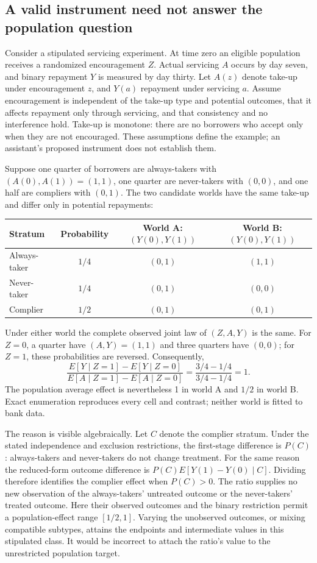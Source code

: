 \subsection{A valid instrument need not answer the population question}

Consider a stipulated servicing experiment. At time zero an eligible population
receives a randomized encouragement $Z$. Actual servicing $A$ occurs by day
seven, and binary repayment $Y$ is measured by day thirty. Let $A(z)$ denote
take-up under encouragement $z$, and $Y(a)$ repayment under servicing $a$.
Assume encouragement is independent of the take-up type and potential outcomes,
that it affects repayment only through servicing, and that consistency and no
interference hold. Take-up is monotone: there are no borrowers who accept only
when they are not encouraged. These assumptions define the example; an
assistant's proposed instrument does not establish them. \citep{exec14_ident_exact}

Suppose one quarter of borrowers are always-takers with $(A(0),A(1))=(1,1)$,
one quarter are never-takers with $(0,0)$, and one half are compliers with
$(0,1)$. The two candidate worlds have the same take-up and differ only in
potential repayments:
\begin{center}
\begin{tabular}{lccc}
\hline
Stratum & Probability & World A: $(Y(0),Y(1))$ & World B: $(Y(0),Y(1))$ \\
\hline
Always-taker & $1/4$ & $(0,1)$ & $(1,1)$ \\
Never-taker & $1/4$ & $(0,1)$ & $(0,0)$ \\
Complier & $1/2$ & $(0,1)$ & $(0,1)$ \\
\hline
\end{tabular}
\end{center}
Under either world the complete observed joint law of $(Z,A,Y)$ is the same.
For $Z=0$, a quarter have $(A,Y)=(1,1)$ and three quarters have $(0,0)$;
for $Z=1$, these probabilities are reversed. Consequently,
\[
 \frac{E[Y\mid Z=1]-E[Y\mid Z=0]}{E[A\mid Z=1]-E[A\mid Z=0]}
 =\frac{3/4-1/4}{3/4-1/4}=1.
\]
The population average effect is nevertheless 1 in world A and $1/2$ in world B.
Exact enumeration reproduces every cell and contrast; neither world is fitted
to bank data. \citep{exec14_ident_exact}

The reason is visible algebraically. Let $C$ denote the complier stratum.
Under the stated independence and exclusion restrictions, the first-stage
difference is $P(C)$: always-takers and never-takers do not change treatment.
For the same reason the reduced-form outcome difference is
$P(C)E[Y(1)-Y(0)\mid C]$. Dividing therefore identifies the complier effect
when $P(C)>0$. The ratio supplies no new observation of the always-takers'
untreated outcome or the never-takers' treated outcome. Here their observed
outcomes and the binary restriction permit a population-effect range
$[1/2,1]$. Varying the unobserved outcomes, or mixing compatible subtypes,
attains the endpoints and intermediate values in this stipulated class.
It would be incorrect to attach the ratio's value to the unrestricted
population target. \citep{exec14_ident_exact}

